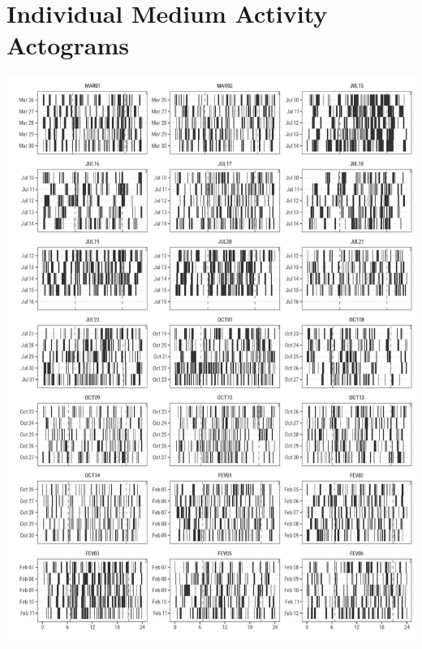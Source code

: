 \documentclass[english,msc,numbers,hidelinks]{coppe}
\begin{document}
  \hypertarget{individual-medium-activity-actograms}{%
  \chapter{Individual Medium Activity Actograms}\label{individual-medium-activity-actograms}}
  \begin{center}\includegraphics[width=0.95\linewidth]{../04_figures/actograms/actograms_medium} \end{center}
\end{document}
